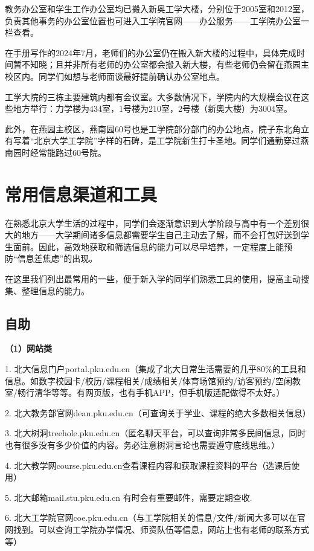 \documentclass[11pt,oneside]{book}
\begin{document}
教务办公室和学生工作办公室均已搬入新奥工学大楼，分别位于2005室和2012室，负责其他事务的办公室位置也可进入工学院官网——办公服务——工学院办公室一栏查看。

在手册写作的2024年7月，老师们的办公室仍在搬入新大楼的过程中，具体完成时间暂不知晓；且并非所有老师的办公室都会搬入新大楼，有些老师仍会留在燕园主校区内。同学们如想与老师面谈最好提前确认办公室地点。

工学大院的三栋主要建筑内都有会议室。大多数情况下，学院内的大规模会议在这些地方举行：力学楼为434室，1号楼为210室，2号楼（新奥大楼）为3004室。

此外，在燕园主校区，燕南园60号也是工学院部分部门的办公地点，院子东北角立有写着“北京大学工学院”字样的石碑，是工学院新生打卡圣地。同学们通勤穿过燕南园时经常能路过60号院。

\section{常用信息渠道和工具}
在熟悉北京大学生活的过程中，同学们会逐渐意识到大学阶段与高中有一个差别很大的地方——大学期间诸多信息都需要学生自己主动去了解，而不会打包好送到学生面前。因此，高效地获取和筛选信息的能力可以尽早培养，一定程度上能预防“信息差焦虑”的出现。

在这里我们列出最常用的一些，便于新入学的同学们熟悉工具的使用，提高主动搜集、整理信息的能力。

\subsection{自助}
\textbf{（1）网站类}

1. 北大信息门户portal.pku.edu.cn（集成了北大日常生活需要的几乎80\%的工具和信息。如数字校园卡/校历/课程相关/成绩相关/体育场馆预约/访客预约/空闲教室/畅行清华等等。有网页版，也有手机APP，但手机版适配做得不太好。）

2. 北大教务部官网dean.pku.edu.cn（可查询关于学业、课程的绝大多数相关信息）

3. 北大树洞treehole.pku.edu.cn（匿名聊天平台，可以查询非常多民间信息，同时也有很多没有多少价值的内容。务必注意树洞言论也需要遵守底线思维。）

4. 北大教学网course.pku.edu.cn查看课程内容和获取课程资料的平台（选课后使用）

5. 北大邮箱mail.stu.pku.edu.cn 有时会有重要邮件，需要定期查收.

6. 北大工学院官网coe.pku.edu.cn（与工学院相关的信息/文件/新闻大多可以在官网找到。可以查询工学院办学情况、师资队伍等信息，网站上也有老师的联系方式等）
\end{document}
